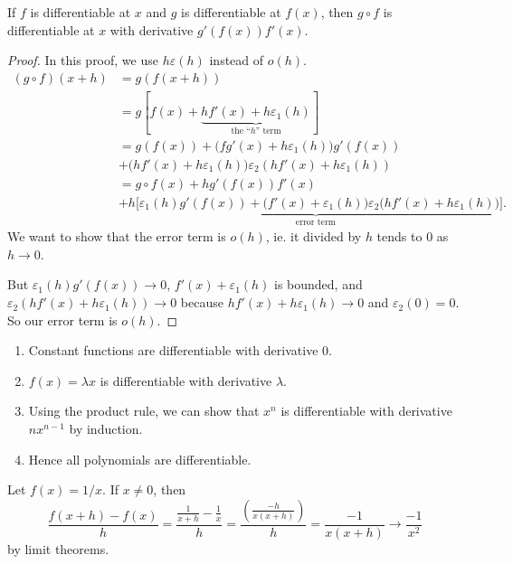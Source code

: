 \documentclass[a4paper]{article}
\begin{document}
\begin{lemma}
  If $f$ is differentiable at $x$ and $g$ is differentiable at $f(x)$, then $g\circ f$ is differentiable at $x$ with derivative $g'(f(x))f'(x)$.
\end{lemma}

\begin{proof}
  In this proof, we use $h\varepsilon(h)$ instead of $o(h)$.
  \begin{align*}
    (g\circ f)(x + h) &= g(f(x + h))\\
    &= g[f(x) + \underbrace{hf'(x) + h\varepsilon_1(h)}_{\text{the ``}h\text{'' term}}]\\
    &= g(f(x)) + \big(fg'(x) + h\varepsilon_1(h)\big)g'(f(x))\\
    &+ \big(hf'(x) + h\varepsilon_1(h)\big)\varepsilon_2(hf'(x) + h\varepsilon_1(h))\\
    &= g\circ f(x) + hg'(f(x))f'(x)\\
    &+ \underbrace{h\Big[\varepsilon_1(h)g'(f(x)) + \big(f'(x) + \varepsilon_1(h)\big)\varepsilon_2\big(hf'(x) + h\varepsilon_1(h)\big)\Big]}_{\text{error term}}.
  \end{align*}
  We want to show that the error term is $o(h)$, ie. it divided by $h$ tends to $0$ as $h\to 0$.

  But $\varepsilon_1(h)g'(f(x))\to 0$, $f'(x) + \varepsilon_1(h)$ is bounded, and $\varepsilon_2(hf'(x) + h\varepsilon_1(h))\to 0$ because $hf'(x) + h\varepsilon_1(h) \to 0$ and $\varepsilon_2(0) = 0$. So our error term is $o(h)$.
\end{proof}

\begin{eg}\leavevmode
  \begin{enumerate}
    \item Constant functions are differentiable with derivative $0$.
    \item $f(x) = \lambda x$ is differentiable with derivative $\lambda$.
    \item Using the product rule, we can show that $x^n$ is differentiable with derivative $nx^{n - 1}$ by induction.
    \item Hence all polynomials are differentiable.
  \end{enumerate}
\end{eg}

\begin{eg}
  Let $f(x) = 1/x$. If $x\not = 0$, then
  \[
    \frac{f(x + h) - f(x)}{h} = \frac{\frac{1}{x + h} - \frac{1}{x}}{h} = \frac{\left(\frac{-h}{x(x + h)}\right)}{h} = \frac{-1}{x(x + h)} \to \frac{-1}{x^2}
  \]
  by limit theorems.
\end{eg}
\end{document}
